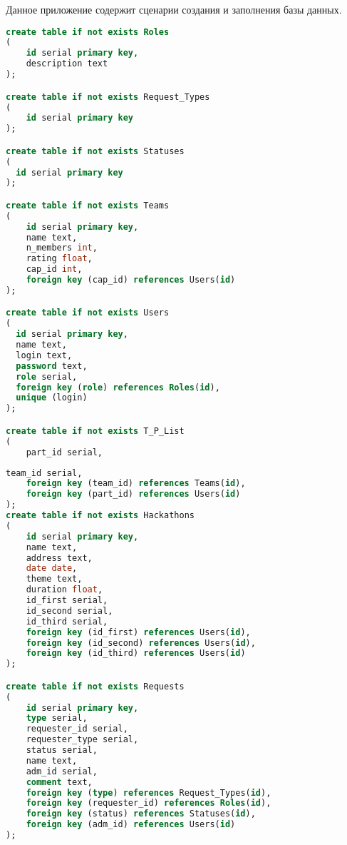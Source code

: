 
Данное приложение содержит сценарии создания и заполнения базы данных.

\captionsetup{singlelinecheck=false, justification=raggedright}
\begin{lstlisting}[language=sql, caption=Создание базы данных и ее сущностей, label=create]
create table if not exists Roles
(
    id serial primary key,
    description text
);

create table if not exists Request_Types
(
    id serial primary key
);

create table if not exists Statuses
(
  id serial primary key
);

create table if not exists Teams
(
    id serial primary key,
    name text,
    n_members int,
    rating float,
    cap_id int,
    foreign key (cap_id) references Users(id)
);

create table if not exists Users
(
  id serial primary key,
  name text,
  login text,
  password text,
  role serial,
  foreign key (role) references Roles(id),
  unique (login)
);

create table if not exists T_P_List
(
    part_id serial,
\end{lstlisting}

\captionsetup{singlelinecheck=false, justification=raggedright}
\begin{lstlisting}[language=sql, caption=Продолжение листинга 4.1, label=fill]
    team_id serial,
    foreign key (team_id) references Teams(id),
    foreign key (part_id) references Users(id)
);
create table if not exists Hackathons
(
    id serial primary key,
    name text,
    address text,
    date date,
    theme text,
    duration float,
    id_first serial,
    id_second serial,
    id_third serial,
    foreign key (id_first) references Users(id),
    foreign key (id_second) references Users(id),
    foreign key (id_third) references Users(id)
);

create table if not exists Requests
(
    id serial primary key,
    type serial,
    requester_id serial,
    requester_type serial,
    status serial,
    name text,
    adm_id serial,
    comment text,
    foreign key (type) references Request_Types(id),
    foreign key (requester_id) references Roles(id),
    foreign key (status) references Statuses(id),
    foreign key (adm_id) references Users(id)
);
\end{lstlisting}

\newpage

